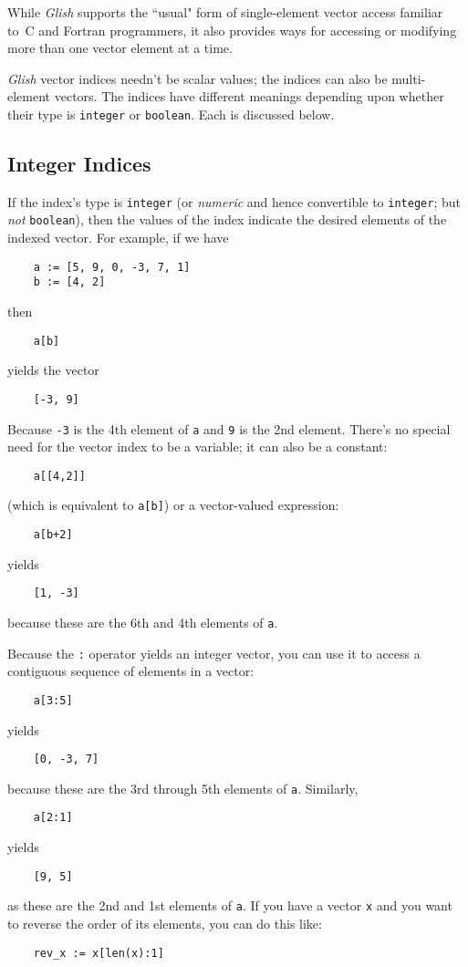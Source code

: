 While {\em Glish} supports the ``usual" form of single-element vector access
familiar to~C and {\sc Fortran} programmers, it also provides
ways for accessing or modifying more than one vector element at a time.

{\em Glish} vector indices needn't be scalar values; the indices can also
be multi-element vectors.  The indices have different meanings depending
upon whether their type is {\tt integer} or {\tt boolean}.  Each is  
discussed below.

\subsection{Integer Indices}
\label{integer-indices}

If the index's type is {\tt integer} (or {\em numeric} and hence convertible
to {\tt integer}; but {\em not} {\tt boolean}),
then the values of the index indicate
the desired elements of the indexed vector.  For example, if we have
\begin{verbatim}
    a := [5, 9, 0, -3, 7, 1]
    b := [4, 2]
\end{verbatim}
then
\begin{verbatim}
    a[b]
\end{verbatim}
yields the vector
\begin{verbatim}
    [-3, 9]
\end{verbatim}
Because {\tt -3} is the 4th element of {\tt a} and {\tt 9} is the 2nd element.
There's no special need for the vector index to be a variable; it
can also  be a constant:
\begin{verbatim}
    a[[4,2]]
\end{verbatim}
(which is equivalent to {\tt a[b]}) or a vector-valued expression:
\begin{verbatim}
    a[b+2]
\end{verbatim}
yields
\begin{verbatim}
    [1, -3]
\end{verbatim}
because these are the 6th and 4th elements of {\tt a}.

Because the {\tt :} operator yields an integer vector, you can
use it to access a contiguous sequence of elements in a vector:
\begin{verbatim}
    a[3:5]
\end{verbatim}
yields
\begin{verbatim}
    [0, -3, 7]
\end{verbatim}
because these are the 3rd through 5th elements of {\tt a}.  Similarly,
\begin{verbatim}
    a[2:1]
\end{verbatim}
yields
\begin{verbatim}
    [9, 5]
\end{verbatim}
as these are the 2nd and 1st elements of {\tt a}.  If you
have a vector {\tt x} and you want to reverse the order of its
elements, you can do this like:
\begin{verbatim}
    rev_x := x[len(x):1]
\end{verbatim}

